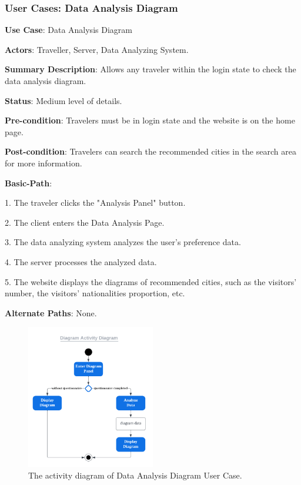 \documentclass[conference]{IEEEtran}
\begin{document}
\subsubsection{User Cases: Data Analysis Diagram}

\textbf{ }

\textbf{Use Case}: Data Analysis Diagram

\textbf{Actors}: Traveller, Server, Data Analyzing System.

\textbf{Summary Description}: Allows any traveler within the login state to check the data analysis diagram.
 
\textbf{Status}: Medium level of details.

\textbf{Pre-condition}: Travelers must be in login state and the website is on the home page.

\textbf{Post-condition}: Travelers can search the recommended cities in the search area for more information.

\textbf{Basic-Path}:

1. The traveler clicks the "Analysis Panel" button.

2. The client enters the Data Analysis Page.

3. The data analyzing system analyzes the user's preference data.

4. The server processes the analyzed data.

5. The website displays the diagrams of recommended cities, such as the visitors' number, the visitors' nationalities proportion, etc.

\textbf{Alternate Paths}: None.

\begin{figure}[htbp]
\centerline{\includegraphics[width=0.5\textwidth]{activity_diagram_diagram.pdf}}
\caption{The activity diagram of Data Analysis Diagram User Case.}
\label{fig3}
\end{figure}
\end{document}
